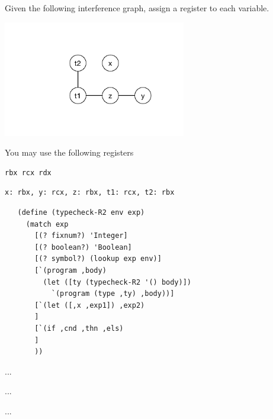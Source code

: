 \documentclass[12pt,answers]{exam}
\begin{document}
\begin{questions}
\question[10] Given the following interference graph, assign a
register to each variable. 
\begin{center}
\includegraphics[height=2in]{interfere2}
\end{center}
You may use the following registers 
\begin{lstlisting}
rbx rcx rdx
\end{lstlisting}

\begin{solution}[1in]
\begin{lstlisting}
x: rbx, y: rcx, z: rbx, t1: rcx, t2: rbx
\end{lstlisting}
\end{solution}


\question[10] 

\begin{lstlisting}
   (define (typecheck-R2 env exp)
     (match exp
       [(? fixnum?) 'Integer]
       [(? boolean?) 'Boolean]
       [(? symbol?) (lookup exp env)]
       [`(program ,body)
         (let ([ty (typecheck-R2 '() body)])
           `(program (type ,ty) ,body))]
       [`(let ([,x ,exp1]) ,exp2)
       ]
       [`(if ,cnd ,thn ,els)
       ]
       ))
\end{lstlisting}



\question[10] ...




\question[10] ...

\question[10] ...

\end{questions}
\end{document}
